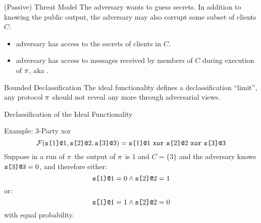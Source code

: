 \documentclass{beamer}
\begin{document}
\begin{frame}{(Passive) Threat Model}
  The adversary wants to guess secrets. In addition to knowing the public
  output, the adversary may also corrupt some subset of clients $C$:
  \begin{itemize}
  \item adversary has access to the secrets of clients in $C$.
  \item adversary has access to messages received by members of $C$ during execution of $\pi$,
    aka .
  \end{itemize}

  \begin{alertblock}{Bounded Declassification}
    The ideal functionality defines a declassification ``limit'', any protocol $\pi$
    should not reveal any more through adversarial views.
  \end{alertblock}
\end{frame}

\begin{frame}{Declassification of the Ideal Functionality}

  \begin{exampleblock}{Example: 3-Party xor}
  $$
  \mathcal{F}(\texttt{s[}1\texttt{]}\texttt{@}1,\texttt{s[}2\texttt{]}\texttt{@}2,\texttt{s[}3\texttt{]}\texttt{@}3) =
  \texttt{s[}1\texttt{]}\texttt{@}1\ \texttt{xor}\ \texttt{s[}2\texttt{]}\texttt{@}2\ \texttt{xor}\ \texttt{s[}3\texttt{]}\texttt{@}3
  $$
  Suppose in a run of $\pi$ the output of $\pi$ is 1 and $C = \{ 3 \}$ and
  the adversary knows $\texttt{s[}3\texttt{]}\texttt{@}3 = 0$, and therefore either:
  $$
  \texttt{s[}1\texttt{]}\texttt{@}1 = 0 \wedge \texttt{s[}2\texttt{]}\texttt{@}2 = 1
  $$
  or:
  $$
  \texttt{s[}1\texttt{]}\texttt{@}1 = 1 \wedge \texttt{s[}2\texttt{]}\texttt{@}2 = 0
  $$
  with equal probability. 
  \end{exampleblock}
  
\end{frame}
\end{document}
